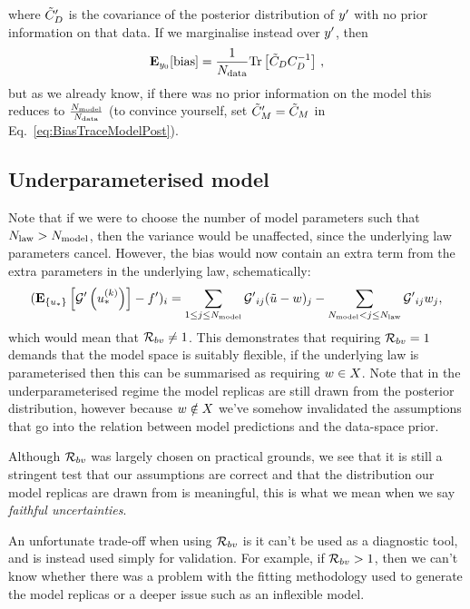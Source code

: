 where ${{\tilde{C}_D}^{\prime}}$ is the covariance of the posterior distribution of
${{y}^{\prime}}$ with no prior information on that data. If we marginalise
instead over ${{y}^{\prime}}$, then
\begin{equation}
    \mathbf{E}_{y_0}[{\rm bias}] = \frac{1}{N_{\rm data}}
    {\rm Tr} \left[
        \tilde{C}_D
        C_{D}^{-1}
    \right] \, ,
\end{equation}
but as we already know, if there was no prior information on the model
this reduces to $\frac{N_{\rm model}}{N_{\rm data}}$ (to convince yourself, set
${{\tilde{C}_M}^{\prime}} = \tilde{C}_M$ in Eq.~\ref{eq:BiasTraceModelPost}).

\subsection{Underparameterised model}

Note that if we were to choose the
number of model parameters such that $N_{\rm law} > N_{\rm model}$, then the variance
would be unaffected, since the underlying law parameters cancel. However, the
bias would now contain an extra term from the extra parameters in the
underlying law, schematically:
\begin{equation}
    \begin{split}
        (\mathbf{E}_{\{ u_* \}} \left[ {{\mathcal{G}}^{\prime}}\left(u_*^{(k)}\right) \right] - {{f}^{\prime}})_i =
        \sum_{1 \leq j \leq N_{\rm model}} {{\mathcal{G}}^{\prime}}_{ij} (\tilde{u} - w)_j -
        \sum_{N_{\rm model} < j \leq N_{\rm law}} {{\mathcal{G}}^{\prime}}_{ij} w_j,
    \end{split}
\end{equation}
which would mean that $\mathcal{R}_{bv} \neq 1$. This demonstrates that requiring
$\mathcal{R}_{bv} = 1$ demands that the model space is suitably flexible, if the
underlying law is parameterised then this can be summarised as requiring
$w \in X$. Note that in the
underparameterised regime the model replicas are still drawn from the posterior
distribution, however because $w \notin X$ we've somehow
invalidated the assumptions that go into the relation between model predictions
and the data-space prior.

Although $\mathcal{R}_{bv}$ was largely chosen on practical
grounds, we see that it is still a stringent test that our assumptions are
correct and that the distribution our model replicas are drawn from is meaningful,
this is what we mean when we say {\em faithful uncertainties}.

An unfortunate
trade-off when using $\mathcal{R}_{bv}$ is it can't be used as a diagnostic
tool, and is instead used simply for validation. For example, if
$\mathcal{R}_{bv} > 1$, then we
can't know whether there was a problem with the fitting methodology used to
generate the model replicas or a deeper issue such as an inflexible model.
